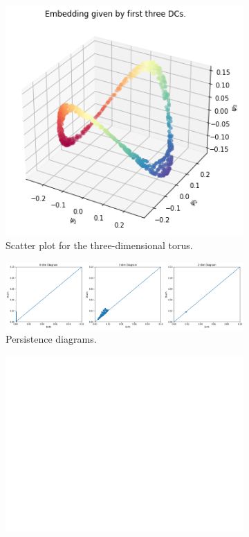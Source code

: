 \begin{figure}[H]
\centering
\begin{subfigure}[b]{0.2\textwidth}
    \includegraphics[width=\textwidth]{figures/topology/torus.png}
    \caption{Scatter plot for the three-dimensional torus.}
\end{subfigure}
\hfill
\begin{subfigure}[b]{0.75\textwidth}
    \includegraphics[width=\textwidth]{figures/topology/torus_Hk.png}
    \caption{Persistence diagrams.}
\end{subfigure}
\begin{subfigure}[b]{0.25\textwidth}
\includegraphics[width=\textwidth]{figures/topology/white.png} 

\end{subfigure}
\end{figure}
